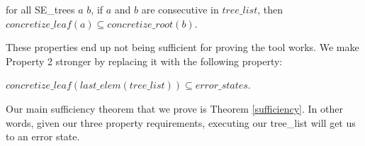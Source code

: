 \begin{axiom}[Property $3$]
for all SE\_trees $a$ $b$, 
if $a$ and $b$ are consecutive in $tree\_list$, then 
$concretize\_leaf (a) \subseteq
concretize\_root(b) $.
\end{axiom}

These properties end up not being sufficient for proving the tool works. 
We make Property 2 stronger by replacing it with the following property:

\begin{axiom}[Property $2'$]
$concretize\_leaf (last\_elem (tree\_list))
\subseteq error\_states $.
\end{axiom}



Our main sufficiency theorem that we prove is Theorem \ref{sufficiency}. In other words, given our three property requirements, executing our tree\_list will get us to an error state.